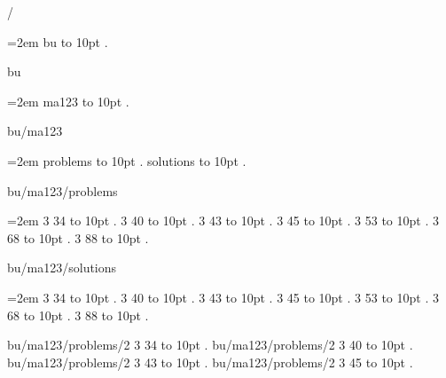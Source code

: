 
\parindent=0pt
\pdfpagewidth=148mm
\pdfpageheight=210mm
\hsize=128mm
\vsize=190mm
\pdfhorigin=0pt
\pdfvorigin=0pt
\hoffset=10mm
\voffset=10mm
/
\par\begingroup
\leftskip=2em
\smallskip
bu \leaders\hbox to 10pt {\hss.\hss}  \hfill {}
\smallskip
\medskip
\par\endgroup
\bigskip
{}
bu
\par\begingroup
\leftskip=2em
\smallskip
ma123 \leaders\hbox to 10pt {\hss.\hss}  \hfill {}
\smallskip
\medskip
\par\endgroup
\bigskip
{}
bu/ma123
\par\begingroup
\leftskip=2em
\smallskip
problems \leaders\hbox to 10pt {\hss.\hss}  \hfill {}
\smallskip
solutions \leaders\hbox to 10pt {\hss.\hss}  \hfill {}
\smallskip
\medskip
\par\endgroup
\bigskip
{}
bu/ma123/problems
\par\begingroup
\leftskip=2em
\smallskip
{} 3 34 \leaders\hbox to 10pt {\hss.\hss}  \hfill {}
 3 40 \leaders\hbox to 10pt {\hss.\hss}  \hfill {}
 3 43 \leaders\hbox to 10pt {\hss.\hss}  \hfill {}
 3 45 \leaders\hbox to 10pt {\hss.\hss}  \hfill {}
 3 53 \leaders\hbox to 10pt {\hss.\hss}  \hfill {}
 3 68 \leaders\hbox to 10pt {\hss.\hss}  \hfill {}
 3 88 \leaders\hbox to 10pt {\hss.\hss}  \hfill {}
\smallskip
\par\endgroup
\bigskip
{}
bu/ma123/solutions
\par\begingroup
\leftskip=2em
\smallskip
{} 3 34 \leaders\hbox to 10pt {\hss.\hss}  \hfill {}
 3 40 \leaders\hbox to 10pt {\hss.\hss}  \hfill {}
 3 43 \leaders\hbox to 10pt {\hss.\hss}  \hfill {}
 3 45 \leaders\hbox to 10pt {\hss.\hss}  \hfill {}
 3 53 \leaders\hbox to 10pt {\hss.\hss}  \hfill {}
 3 68 \leaders\hbox to 10pt {\hss.\hss}  \hfill {}
 3 88 \leaders\hbox to 10pt {\hss.\hss}  \hfill {}
\smallskip
\par\endgroup
\bigskip
bu/ma123/problems/2 3 34 \leaders\hbox to 10pt {\hss.\hss}  \hfill {}
\smallskip
bu/ma123/problems/2 3 40 \leaders\hbox to 10pt {\hss.\hss}  \hfill {}
\smallskip
bu/ma123/problems/2 3 43 \leaders\hbox to 10pt {\hss.\hss}  \hfill {}
\smallskip
bu/ma123/problems/2 3 45 \leaders\hbox to 10pt {\hss.\hss}  \hfill {}
